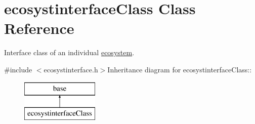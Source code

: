 \hypertarget{classecosystinterface_class}{
\section{ecosystinterfaceClass Class Reference}
\label{classecosystinterface_class}
}


Interface class of an individual \hyperlink{classecosystem}{ecosystem}.  


{\ttfamily \#include $<$ecosystinterface.h$>$}Inheritance diagram for ecosystinterfaceClass::\begin{figure}[H]
\begin{center}
\leavevmode
\includegraphics[height=2cm]{classecosystinterface_class}
\end{center}
\end{figure}
